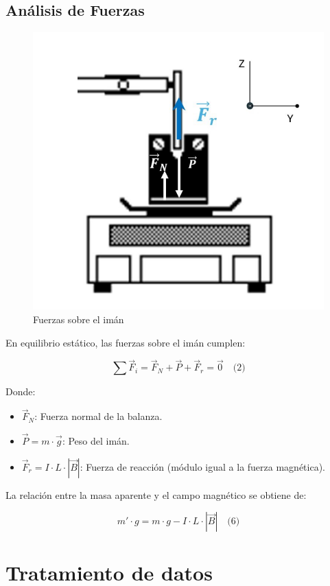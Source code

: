 \documentclass{article}
\begin{document}
\subsection{Análisis de Fuerzas}
\begin{figure}[H]
    \centering
    \includegraphics[scale=0.35]{images/fuerzasIman.png}
    \caption{Fuerzas sobre el imán}
\end{figure}
En equilibrio estático, las fuerzas sobre el imán cumplen:

\[
\sum \vec{F}_i = \vec{F}_N + \vec{P} + \vec{F}_r = \vec{0} \quad \text{(2)}
\]

Donde:
\begin{itemize}
    \item \( \vec{F}_N \): Fuerza normal de la balanza.
    \item \( \vec{P} = m \cdot \vec{g} \): Peso del imán.
    \item \( \vec{F}_r = I \cdot L \cdot |\vec{B}| \): Fuerza de reacción (módulo igual a la fuerza magnética).
\end{itemize}

La relación entre la masa aparente y el campo magnético se obtiene de:

\[
m' \cdot g = m \cdot g - I \cdot L \cdot |\vec{B}| \quad \text{(6)}
\]

\section{Tratamiento de datos}
\end{document}
